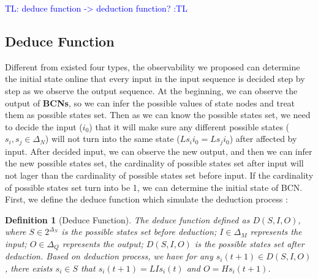 \documentclass[letterpaper, 10 pt, conference]{ieeeconf}  %
\newtheorem{definition}{Definition}
\newcommand{\tl}[1]{\textcolor{blue} {TL: #1 :TL} }
\begin{document}
\tl{deduce function -> deduction function?} 

\subsection{Deduce Function}
Different from existed four types, the observability we proposed can determine the initial state online that every input in the input sequence is decided step by step as we observe the output sequence. At the beginning, we can observe the output of {\bf BCNs}, so we can infer the possible values of state nodes and treat them as possible states set. Then as we can know the possible states set, we need to decide the input ($i_0$) that it will make sure any different possible states ($s_i, s_j\in \Delta_N$) will not turn into the same state ($Ls_i i_0=Ls_j i_0$) after affected by input. After decided input, we can observe the new output, and then we can infer the new possible states set, the cardinality of possible states set after input will not lager than the cardinality of possible states set before input. If the cardinality of possible states set turn into be 1, we can determine the initial state of BCN. First, we define the deduce function  which simulate the deduction process :
\begin{definition}[Deduce Function] The deduce function defined as $D\left(S, I, O\right)$, where $S\in 2^{\Delta_N}$ is the possible states set before deduction; $I\in\Delta_M$ represents the input; $O\in\Delta_Q$ represents the output; $D\left(S, I, O\right)$ is the possible states set after deduction. Based on deduction process, we have for any $s_i(t+1)\in D\left(S, I, O\right)$, there exists $s_i\in S$ that $s_i(t+1)=LIs_i(t)$ and $O=Hs_i(t+1)$.
\end{definition}
\end{document}
